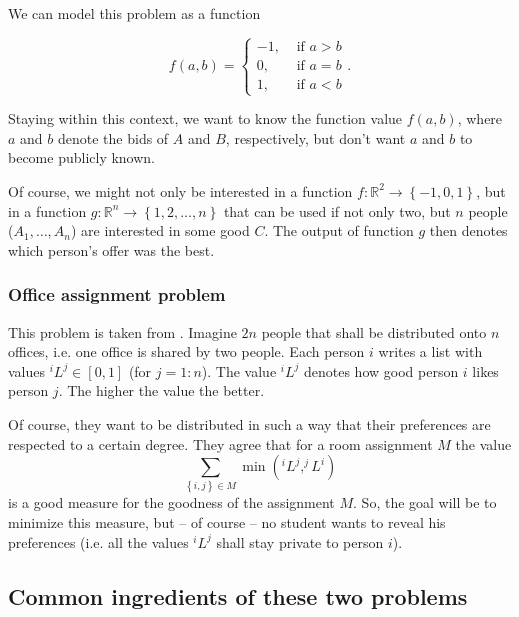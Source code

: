\message{ !name(seminar.tex)}\documentclass{llncs}
\begin{document}
We can model this problem as a function

\begin{equation}
  f(a,b)=
  \begin{cases}
    -1, & \text{ if } a>b \\
    0, & \text{ if } a=b \\
    1, & \text{ if } a<b
  \end{cases}.
\end{equation}

Staying within this context, we want to know the function value $f(a,b)$, where $a$ and $b$ denote the bids of $A$ and $B$, respectively, but don't want $a$ and $b$ to become publicly known.

Of course, we might not only be interested in a function $f:\mathbb R ^2\rightarrow \left\{ -1,0,1 \right\}$, but in a function $g: \mathbb R ^n \rightarrow \left\{ 1,2,\dots,n \right\}$ that can be used if not only two, but $n$ people ($A_1,\dots,A_n$) are interested in some good $C$. The output of function $g$ then denotes which person's offer was the best.

\subsubsection{Office assignment problem}
\label{sec:office-assignment-intro-problem}

This problem is taken from \cite{Rogaway:1991:RCS:888502}. Imagine $2n$ people that shall be distributed onto $n$ offices, i.e. one office is shared by two people. Each person $i$ writes a list with values $^iL^j\in [0,1]$ (for $j=1:n$). The value $^iL^j$ denotes how good person $i$ likes person $j$. The higher the value the better.

Of course, they want to be distributed in such a way that their preferences are respected to a certain degree. They agree that for a room assignment $M$ the value
\begin{equation*}
\sum_{\left\{i,j \right\}\in M}\min(^iL^j, ^jL^i)
\end{equation*}
is a good measure for the goodness of the assignment $M$. So, the goal will be to minimize this measure, but -- of course -- no student wants to reveal his preferences (i.e. all the values $^iL^j$ shall stay private to person $i$).

\subsection{Common ingredients of these two problems}
\label{sec:introductory-common-ingredients}
\end{document}
